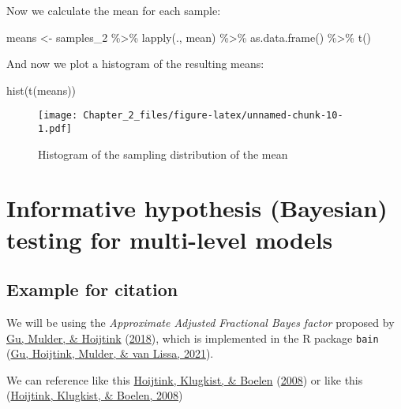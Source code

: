 \documentclass[
]{book}
\newenvironment{Shaded}{\begin{snugshade}}{\end{snugshade}}
\newcommand{\FunctionTok}[1]{\textcolor[rgb]{0.00,0.00,0.00}{#1}}
\newcommand{\NormalTok}[1]{#1}
\newcommand{\OtherTok}[1]{\textcolor[rgb]{0.56,0.35,0.01}{#1}}
\newcommand{\SpecialCharTok}[1]{\textcolor[rgb]{0.00,0.00,0.00}{#1}}
\begin{document}
Now we calculate the mean for each sample:

\begin{Shaded}
\begin{Highlighting}[]
\NormalTok{means }\OtherTok{\textless{}{-}}\NormalTok{ samples\_2 }\SpecialCharTok{\%\textgreater{}\%}
  \FunctionTok{lapply}\NormalTok{(., mean) }\SpecialCharTok{\%\textgreater{}\%}
  \FunctionTok{as.data.frame}\NormalTok{() }\SpecialCharTok{\%\textgreater{}\%}
  \FunctionTok{t}\NormalTok{()}
\end{Highlighting}
\end{Shaded}

And now we plot a histogram of the resulting means:

\begin{Shaded}
\begin{Highlighting}[]
\FunctionTok{hist}\NormalTok{(}\FunctionTok{t}\NormalTok{(means))}
\end{Highlighting}
\end{Shaded}

\begin{figure}
\centering
\texttt{[image: Chapter\_2\_files/figure-latex/unnamed-chunk-10-1.pdf]}
\caption{\label{fig:unnamed-chunk-10}Histogram of the sampling distribution of the mean}
\end{figure}

\hypertarget{informative-hypothesis-bayesian-testing-for-multi-level-models}{%
\chapter{Informative hypothesis (Bayesian) testing for multi-level models}\label{informative-hypothesis-bayesian-testing-for-multi-level-models}}

\hypertarget{example-for-citation}{%
\section{Example for citation}\label{example-for-citation}}

We will be using the \emph{Approximate Adjusted Fractional Bayes factor} proposed by \protect\hyperlink{ref-gu2018approximated}{Gu, Mulder, \& Hoijtink} (\protect\hyperlink{ref-gu2018approximated}{2018}), which is implemented in the R package \texttt{bain} (\protect\hyperlink{ref-bain}{Gu, Hoijtink, Mulder, \& van Lissa, 2021}).

We can reference like this \protect\hyperlink{ref-hoijtink2008bayesian}{Hoijtink, Klugkist, \& Boelen} (\protect\hyperlink{ref-hoijtink2008bayesian}{2008}) or like this (\protect\hyperlink{ref-hoijtink2008bayesian}{Hoijtink, Klugkist, \& Boelen, 2008})
\end{document}

